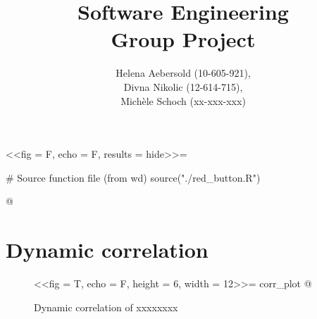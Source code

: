 \documentclass[11pt,a4paper]{report}
\begin{document}
\title{\textbf{Software Engineering} \\ \vspace{40pt} Group Project}
\author{Helena Aebersold (10-605-921), \\ Divna Nikolic (12-614-715), \\ Michèle Schoch (xx-xxx-xxx)}
\maketitle


<<fig = F, echo = F, results = hide>>=

# Source function file (from wd)
source("./red_button.R")

@



\newpage
\section*{Dynamic correlation}

\begin{figure}[H]
\caption{Dynamic correlation of xxxxxxxx}
\label{dyn_corr}
\centering
<<fig = T, echo = F, height = 6, width = 12>>=
corr_plot
@
\end{figure}
\end{document}
